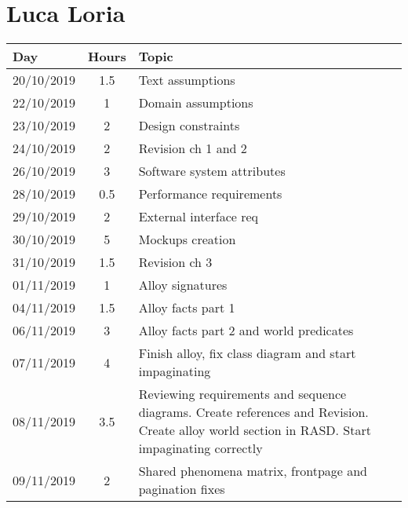 \section{Luca Loria}
\begin{table}[H]
    \centering
    \begin{tabularx}{\textwidth}{ |l|c|X| }
        \hline
        Day & Hours & Topic \\
        \hline
        20/10/2019 & 1.5 & Text assumptions \\								
        \hline
        22/10/2019 & 1	& Domain assumptions \\
        \hline
        23/10/2019 & 2	& Design constraints \\
        \hline								
        24/10/2019 & 2	& Revision ch 1 and 2 \\									
        \hline
        26/10/2019 & 3 & Software system attributes \\									
        \hline
        28/10/2019 & 0.5 & Performance requirements \\									
        \hline
        29/10/2019 & 2	& External interface req \\									
        \hline
        30/10/2019 & 5 & Mockups creation \\									
        \hline
        31/10/2019 & 1.5 & Revision ch 3 \\									
        \hline
        01/11/2019 & 1 & Alloy signatures \\									
        \hline
        04/11/2019 & 1.5 & Alloy facts part 1 \\									
        \hline
        06/11/2019 & 3 & Alloy facts part 2 and world predicates \\						
        \hline
        07/11/2019 & 4 & Finish alloy, fix class diagram and start impaginating \\		
        \hline
        08/11/2019 & 3.5 & Reviewing requirements and sequence diagrams. Create references and Revision. Create alloy world section in RASD. Start impaginating correctly	\\
        \hline
        09/11/2019 & 2 & Shared phenomena matrix, frontpage and pagination fixes \\
        \hline							
    \end{tabularx}
  \end{table}

